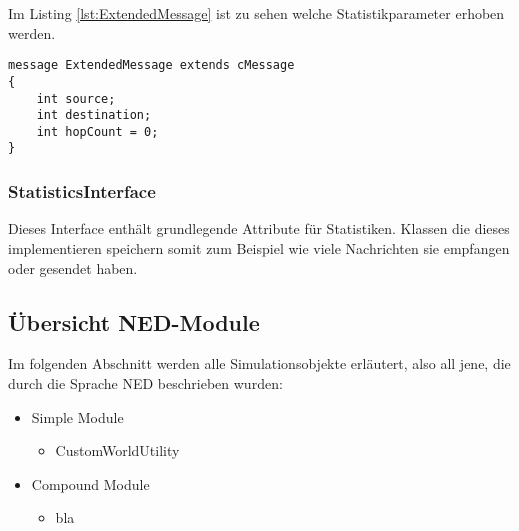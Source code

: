 Im Listing \ref{lst:ExtendedMessage} ist zu sehen welche Statistikparameter erhoben werden.

\begin{minipage}{\textwidth}
\begin{lstlisting}[language=NED, label=lst:ExtendedMessage]
message ExtendedMessage extends cMessage
{
	int source;
    int destination;
    int hopCount = 0;    
}
\end{lstlisting}
\end{minipage}

\subsubsection{StatisticsInterface}

Dieses Interface enthält grundlegende Attribute für Statistiken. Klassen die dieses implementieren speichern somit zum Beispiel wie viele Nachrichten sie empfangen oder gesendet haben.


\subsection{Übersicht NED-Module}

Im folgenden Abschnitt werden alle Simulationsobjekte erläutert, also all jene, die durch die Sprache NED beschrieben wurden:

\begin{itemize}{\label{enum:Netzwerk}}
\item Simple Module
\begin{multicols}{2}
\begin{itemize}
\item CustomWorldUtility  
\end{itemize}
\end{multicols}
\item Compound Module
\begin{multicols}{2}
\begin{itemize}
\item bla
\end{itemize}
\end{multicols}
\end{itemize}

